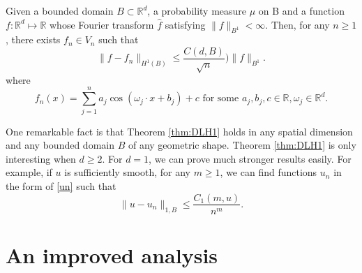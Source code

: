 \begin{theorem}  \label{thm:DLH1}
	Given a bounded domain $B\subset\mathbb R^d$, a probability measure $\mu$ on B
	and a function $f:\mathbb R^d\mapsto\mathbb R$ whose Fourier
	transform $\hat f$ satisfying $\|f\|_{B^1}<\infty$.
	Then, for any $n\ge 1$,  there exists $f_n\in V_n$  such that
	\begin{equation}
		\|f-f_n\|_{H^1(B)}\le \frac{C(d,B)}{\sqrt{n}})\|f\|_{B^1}.
	\end{equation}
	where 
	\begin{equation}
		\label{un}
		f_n(x)=\sum_{j=1}^na_j\cos(\omega_j\cdot x+b_j)+c \mbox{ for some }
		a_j,b_j,c\in \mathbb R, \omega_j\in\mathbb R^d.
	\end{equation}
\end{theorem}

One remarkable fact is that Theorem \ref{thm:DLH1} holds in any spatial
dimension and any bounded domain $B$ of any geometric shape.
Theorem \ref{thm:DLH1} is only interesting when $d\ge 2$.  For $d=1$,
we can prove much stronger results easily.  For example, if $u$
is sufficiently smooth, for any $m\ge 1$, we can find functions $u_n$
in the form of \eqref{un} such that 
\begin{equation}
	\label{uun1}
	\|u-u_n\|_{1,B}\le \frac{C_1(m,u)}{n^{m}}.  
\end{equation}
\newpage 


\section{An improved analysis}
